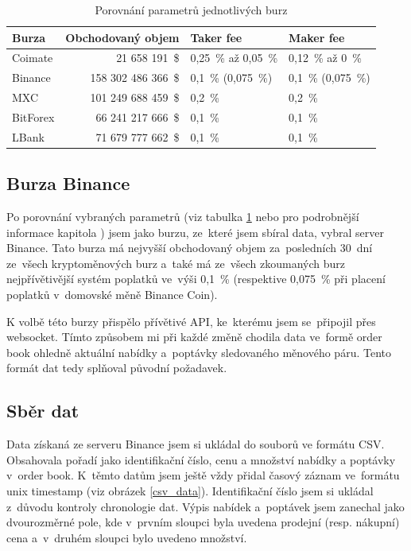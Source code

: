 \documentclass[thesis=B,czech]{FITthesis}[2019/03/21]
\begin{document}
\begin{table}\centering
     \caption{Porovnání parametrů jednotlivých burz}
     \label{exchanges_comparison}
     \begin{tabular}{||l | r | l | l||} 
     \hline
     Burza & Obchodovaný objem & Taker fee & Maker fee \\ [0.5ex]
     \hline\hline
     Coimate & 21 658 191~\$ & 0,25~\% až 0,05~\% & 0,12~\% až 0~\%  \\ 
     \hline
     Binance & 158 302 486 366~\$ & 0,1~\% (0,075~\%) & 0,1~\% (0,075~\%)  \\ 
     \hline
     MXC & 101 249 688 459~\$ & 0,2~\% & 0,2~\%  \\ 
     \hline
     BitForex & 66 241 217 666~\$ & 0,1~\% & 0,1~\%  \\ 
     \hline
     LBank & 71 679 777 662~\$ & 0,1~\% & 0,1~\%  \\ 
     \hline
    \end{tabular}
\end{table}

\subsection{Burza Binance}
Po porovnání vybraných parametrů (viz tabulka \ref{exchanges_comparison} nebo pro podrobnější informace kapitola ) jsem jako burzu, ze~které jsem sbíral data, vybral server Binance. Tato burza má nejvyšší obchodovaný objem za~posledních 30~dní ze~všech kryptoměnových burz \cite{coinmarketcap} a~také má ze~všech zkoumaných burz nejpřívětivější systém poplatků ve~výši 0,1~\% (respektive 0,075~\% při placení poplatků v~domovské měně Binance Coin).

K volbě této burzy přispělo přívětivé API, ke~kterému jsem se~připojil přes websocket. \cite{BinanceApi} Tímto způsobem mi při každé změně chodila data ve~formě order book ohledně aktuální nabídky a~poptávky sledovaného měnového páru. Tento formát dat tedy splňoval původní požadavek. \cite{BinanceApi}

\subsection{Sběr dat}
Data získaná ze serveru Binance jsem si ukládal do souborů ve formátu CSV. Obsahovala pořadí jako identifikační číslo, cenu a množství nabídky a poptávky v~order book. K~těmto datům jsem ještě vždy přidal časový záznam ve~formátu unix timestamp (viz obrázek \ref{csv_data}). Identifikační číslo jsem si ukládal z~důvodu kontroly chronologie dat. Výpis nabídek a~poptávek jsem zanechal jako dvourozměrné pole, kde v~prvním sloupci byla uvedena prodejní (resp. nákupní) cena a~v~druhém sloupci bylo uvedeno množství.
\end{document}
